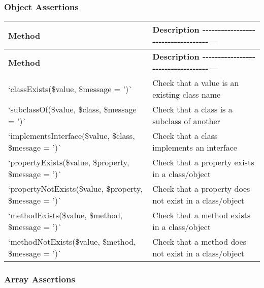 \subsubsection*{Object Assertions}

\tabulinesep=1mm
\begin{longtabu} spread 0pt [c]{*{2}{|X[-1]}|}
\hline
\rowcolor{\tableheadbgcolor}\textbf{ Method  }&\textbf{ Description -\/-\/-\/-\/-\/-\/-\/-\/-\/-\/-\/-\/-\/-\/-\/-\/-\/-\/-\/-\/-\/-\/-\/-\/-\/-\/-\/-\/-\/-\/-\/-\/-\/-\/-\/---   }\\
\endfirsthead
\hline
\endfoot
\hline
\rowcolor{\tableheadbgcolor}\textbf{ Method  }&\textbf{ Description -\/-\/-\/-\/-\/-\/-\/-\/-\/-\/-\/-\/-\/-\/-\/-\/-\/-\/-\/-\/-\/-\/-\/-\/-\/-\/-\/-\/-\/-\/-\/-\/-\/-\/-\/---   }\\
\endhead
`class\+Exists(\$value, \$message = '\textquotesingle{})\`{}  &Check that a value is an existing class name   \\
`subclass\+Of(\$value, \$class, \$message = '\textquotesingle{})\`{}  &Check that a class is a subclass of another   \\
`implements\+Interface(\$value, \$class, \$message = '\textquotesingle{})\`{}  &Check that a class implements an interface   \\
`property\+Exists(\$value, \$property, \$message = '\textquotesingle{})\`{}  &Check that a property exists in a class/object   \\
`property\+Not\+Exists(\$value, \$property, \$message = '\textquotesingle{})\`{}  &Check that a property does not exist in a class/object   \\
`method\+Exists(\$value, \$method, \$message = '\textquotesingle{})\`{}  &Check that a method exists in a class/object   \\
`method\+Not\+Exists(\$value, \$method, \$message = '\textquotesingle{})\`{}  &Check that a method does not exist in a class/object   \\
\end{longtabu}


\subsubsection*{Array Assertions}

